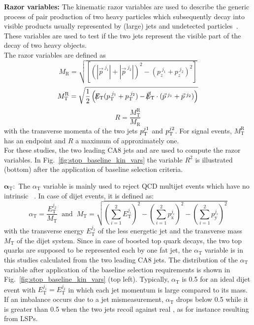 \begin{description}
 \item \textbf{Razor variables:} The kinematic razor variables are used to describe the generic process of pair production of two heavy particles which subsequently decay into visible products usually represented by (large) jets and undetected particles~\cite{Chatrchyan:2012uea, Chatrchyan:2014goa, CMS-PAS-SUS-14-011}. These variables are used to test if the two jets represent the visible part of the decay of two heavy objects. \\
The razor variables are defined as
\begin{equation}
M_\mathrm{R} = \sqrt{\left[(|\vec{p}^{\; j_1} | + |\vec{p}^{\; j_2} |)^2 - (p_z^{\; j_1}  + p_z^{\; j_2} )^2 \right]}
\end{equation}
 \begin{equation}
M_\mathrm{T}^\mathrm{R} = \sqrt{\frac{1}{2} \left( \slash\mkern-12mu{E}_{\text{T}} (p_{\text{T}}^{\; j_1}  + p_{\text{T}}^{\; j_2} ) - \slash\mkern-12mu{\vec{E}}_{\text{T}} \cdot (\vec{p}^{\; j_1} + \vec{p}^{\; j_2}) \right) }
\end{equation}
\begin{equation}
R = \frac{M_\mathrm{T}^\mathrm{R}}{M_\mathrm{R}}
\end{equation}
with the transverse momenta of the two jets $p_{\text{T}}^{j1}$ and $p_{\text{T}}^{j2}$. For signal events, $M_\mathrm{T}^\mathrm{R}$ has an endpoint and $R$ a maximum of approximately one. \\
For these studies, the two leading CA8 jets and \met are used to compute the razor variables. In Fig.~\ref{fig:stop_baseline_kin_vars} the variable $R^2$ is illustrated (bottom) after the application of baseline selection criteria. 
\item $\mathbf{\alpha_\mathrm{T}:}$ The $\alpha_\mathrm{T}$ variable is mainly used to reject QCD multijet events which have no intrinsic \met~\cite{Chatrchyan:2012wa, Chatrchyan:2013lya}. In case of dijet events, it is defined as:
\begin{equation}
 \alpha_\mathrm{T} = \frac{E_\mathrm{T}^{j_2}}{M_\mathrm{T}} \;\; \mathrm{and} \;\; M_\mathrm{T} = \sqrt{\left( \sum_{i=1}^{2} E_\mathrm{T}^{j_i} \right)^2 - \left( \sum_{i=1}^{2} p_\mathrm{x}^{j_i} \right)^2 - \left( \sum_{i=1}^{2} p_\mathrm{y}^{j_i} \right)^2}
\end{equation}
with the transverse energy $E_\mathrm{T}^{j_2}$ of the less energetic jet and the transverse mass $M_\mathrm{T}$ of the dijet system. Since in case of boosted top quark decays, the two top quarks are supposed to be represented each by one fat jet, the $\alpha_\mathrm{T}$ variable is in this studies calculated from the two leading CA8 jets. The distribution of the $\alpha_\mathrm{T}$ variable after application of the baseline selection requirements is shown in Fig.~\ref{fig:stop_baseline_kin_vars} (top left). Typically, $\alpha_\mathrm{T}$ is 0.5 for an ideal dijet event with $E_\mathrm{T}^{j_1} = E_\mathrm{T}^{j_2}$ in which each jet momentum is large compared to its mass. If an imbalance occurs due to a jet mismeasurement, $\alpha_\mathrm{T}$ drops below 0.5 while it is greater than 0.5 when the two jets recoil against real \met, as for instance resulting from LSPs.
\end{description} 
